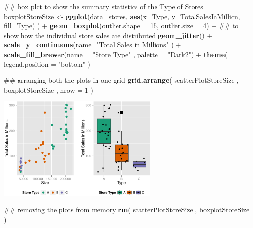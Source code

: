 \documentclass[]{article}
\newenvironment{Shaded}{\begin{snugshade}}{\end{snugshade}}
\newcommand{\KeywordTok}[1]{\textcolor[rgb]{0.13,0.29,0.53}{\textbf{{#1}}}}
\newcommand{\DataTypeTok}[1]{\textcolor[rgb]{0.13,0.29,0.53}{{#1}}}
\newcommand{\DecValTok}[1]{\textcolor[rgb]{0.00,0.00,0.81}{{#1}}}
\newcommand{\StringTok}[1]{\textcolor[rgb]{0.31,0.60,0.02}{{#1}}}
\newcommand{\NormalTok}[1]{{#1}}
\begin{document}
\begin{Shaded}
\begin{Highlighting}[]
\NormalTok{## box plot to show the summary statistics of the Type of Stores}
\NormalTok{boxplotStoreSize <-}\StringTok{ }\KeywordTok{ggplot}\NormalTok{(}\DataTypeTok{data=}\NormalTok{stores, }
       \KeywordTok{aes}\NormalTok{(}\DataTypeTok{x=}\NormalTok{Type, }\DataTypeTok{y=}\NormalTok{TotalSalesInMillion, }\DataTypeTok{fill=}\NormalTok{Type) ) +}\StringTok{ }
\StringTok{  }\KeywordTok{geom_boxplot}\NormalTok{(}\DataTypeTok{outlier.shape =} \DecValTok{15}\NormalTok{, }\DataTypeTok{outlier.size =} \DecValTok{4}\NormalTok{) +}
\StringTok{  }\NormalTok{## to show how the individual store sales are distributed}
\StringTok{  }\KeywordTok{geom_jitter}\NormalTok{() +}
\StringTok{  }\KeywordTok{scale_y_continuous}\NormalTok{(}\DataTypeTok{name=}\StringTok{"Total Sales in Millions"} \NormalTok{) +}
\StringTok{  }\KeywordTok{scale_fill_brewer}\NormalTok{(}\DataTypeTok{name =} \StringTok{"Store Type"} \NormalTok{, }\DataTypeTok{palette =} \StringTok{"Dark2"}\NormalTok{) +}
\StringTok{  }\KeywordTok{theme}\NormalTok{( }\DataTypeTok{legend.position =} \StringTok{"bottom"} \NormalTok{)}
\end{Highlighting}
\end{Shaded}

\begin{Shaded}
\begin{Highlighting}[]
\NormalTok{## arranging both the plots in one grid}
\KeywordTok{grid.arrange}\NormalTok{( scatterPlotStoreSize , boxplotStoreSize , }\DataTypeTok{nrow =} \DecValTok{1} \NormalTok{)}
\end{Highlighting}
\end{Shaded}

\includegraphics[width=300px]{PredictingWeeklySalesAtWalmart_files/figure-latex/storeTypeScatterBoxGrid-1}

\begin{Shaded}
\begin{Highlighting}[]
\NormalTok{## removing the plots from memory}
\KeywordTok{rm}\NormalTok{( scatterPlotStoreSize , boxplotStoreSize )}
\end{Highlighting}
\end{Shaded}
\end{document}
